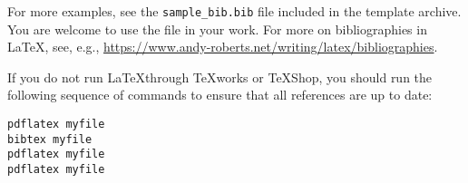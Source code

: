 \documentclass[sigconf, nonacm, natbib, screen, balance=False]{acmart}
\begin{document}
For more examples, see the \verb!sample_bib.bib! file included in the
template archive. You are welcome to use the file in your work. For
more on bibliographies in \LaTeX, see, e.g.,
\url{https://www.andy-roberts.net/writing/latex/bibliographies}.

If you do not run \LaTeX through TeXworks or TeXShop, you should run
the following sequence of commands to ensure that all references are
up to date:

\begin{verbatim}
pdflatex myfile
bibtex myfile
pdflatex myfile 
pdflatex myfile 
\end{verbatim}




\end{document}
